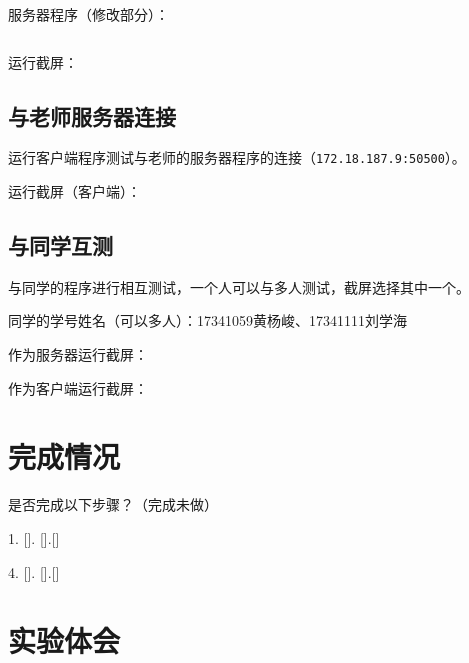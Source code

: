 \documentclass[logo,reportComp]{thesis}
\begin{document}
服务器程序（修改部分）：
\begin{lstlisting}
\end{lstlisting}

运行截屏：

\subsection{与老师服务器连接}
运行客户端程序测试与老师的服务器程序的连接（\verb'172.18.187.9:50500'）。

运行截屏（客户端）：

\subsection{与同学互测}
与同学的程序进行相互测试，一个人可以与多人测试，截屏选择其中一个。

同学的学号姓名（可以多人）：17341059黄杨峻、17341111刘学海

作为服务器运行截屏：
      
作为客户端运行截屏：


\section{完成情况}
是否完成以下步骤？（\cmark 完成\quad\xmark 未做）
\par 1. [\cmark]. [\cmark].[\cmark]
\par 4. [\cmark]. [\cmark].[\cmark]

\section{实验体会}
\end{document}
